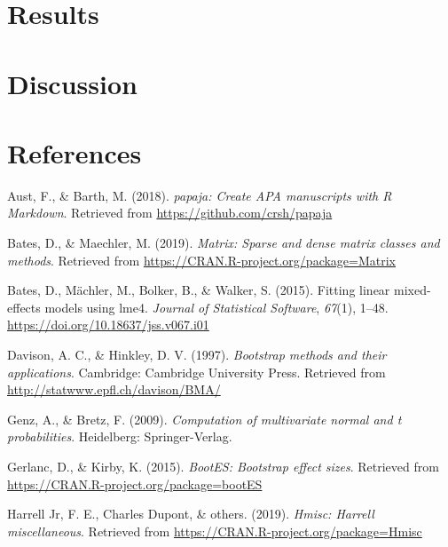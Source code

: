 \documentclass[man]{apa6}
\begin{document}
\hypertarget{results-6}{%
\section{Results}\label{results-6}}

\hypertarget{discussion-3}{%
\section{Discussion}\label{discussion-3}}

\newpage

\hypertarget{references}{%
\section{References}\label{references}}

\begingroup
\setlength{\parindent}{-0.5in}
\setlength{\leftskip}{0.5in}

\hypertarget{refs}{}
\leavevmode\hypertarget{ref-R-papaja}{}%
Aust, F., \& Barth, M. (2018). \emph{papaja: Create APA manuscripts with R Markdown}. Retrieved from \url{https://github.com/crsh/papaja}

\leavevmode\hypertarget{ref-R-Matrix}{}%
Bates, D., \& Maechler, M. (2019). \emph{Matrix: Sparse and dense matrix classes and methods}. Retrieved from \url{https://CRAN.R-project.org/package=Matrix}

\leavevmode\hypertarget{ref-R-lme4}{}%
Bates, D., Mächler, M., Bolker, B., \& Walker, S. (2015). Fitting linear mixed-effects models using lme4. \emph{Journal of Statistical Software}, \emph{67}(1), 1--48. \url{https://doi.org/10.18637/jss.v067.i01}

\leavevmode\hypertarget{ref-R-boot}{}%
Davison, A. C., \& Hinkley, D. V. (1997). \emph{Bootstrap methods and their applications}. Cambridge: Cambridge University Press. Retrieved from \url{http://statwww.epfl.ch/davison/BMA/}

\leavevmode\hypertarget{ref-R-mvtnorm}{}%
Genz, A., \& Bretz, F. (2009). \emph{Computation of multivariate normal and t probabilities}. Heidelberg: Springer-Verlag.

\leavevmode\hypertarget{ref-R-bootES}{}%
Gerlanc, D., \& Kirby, K. (2015). \emph{BootES: Bootstrap effect sizes}. Retrieved from \url{https://CRAN.R-project.org/package=bootES}

\leavevmode\hypertarget{ref-R-Hmisc}{}%
Harrell Jr, F. E., Charles Dupont, \& others. (2019). \emph{Hmisc: Harrell miscellaneous}. Retrieved from \url{https://CRAN.R-project.org/package=Hmisc}
\end{document}
